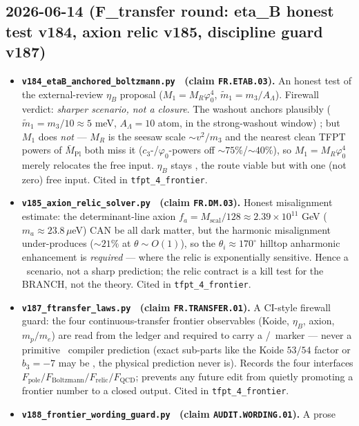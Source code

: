 \subsection*{2026-06-14 (F\_transfer round: eta\_B honest test v184, axion relic v185, discipline guard v187)}
\begin{itemize}
\item \textbf{\texttt{v184\_etaB\_anchored\_boltzmann.py} \mC\ (claim \texttt{FR.ETAB.03}).} An honest
  test of the external-review $\eta_B$ proposal ($M_1=M_R\varphi_0^4$, $\tilde m_1=m_3/A_\Lambda$).
  Firewall verdict: \emph{sharper scenario, not a closure}. The washout anchors plausibly
  ($\tilde m_1=m_3/10\approx5$ meV, $A_\Lambda=10$ atom, in the strong-washout window) \mC; but $M_1$
  does \emph{not} --- $M_R$ is the seesaw scale $\sim v^2/m_3$ and the nearest clean TFPT powers of
  $\bar M_{\mathrm{Pl}}$ both miss it ($c_3$-/$\varphi_0$-powers off ${\sim}75\%$/${\sim}40\%$), so
  $M_1=M_R\varphi_0^4$ merely relocates the free input. $\eta_B$ stays \mC, the route viable but with one
  (not zero) free input. Cited in \texttt{tfpt\_4\_frontier}.
\item \textbf{\texttt{v185\_axion\_relic\_solver.py} \mC\ (claim \texttt{FR.DM.03}).} Honest misalignment
  estimate: the determinant-line axion $f_a=M_{\mathrm{scal}}/128\approx2.39{\times}10^{11}$ GeV
  ($m_a\approx23.8\,\mu$eV) CAN be all dark matter, but the harmonic misalignment under-produces
  (${\sim}21\%$ at $\theta\sim O(1)$), so the $\theta_i\approx170^\circ$ hilltop anharmonic enhancement is
  \emph{required} --- where the relic is exponentially sensitive. Hence a \mC\ scenario, not a sharp
  prediction; the relic contract is a kill test for the BRANCH, not the theory. Cited in
  \texttt{tfpt\_4\_frontier}.
\item \textbf{\texttt{v187\_ftransfer\_laws.py} \mE\ (claim \texttt{FR.TRANSFER.01}).} A CI-style
  firewall guard: the four continuous-transfer frontier observables (Koide, $\eta_B$, axion,
  $m_p/m_e$) are read from the ledger and required to carry a \mC/\mO\ marker --- never a primitive
  \mE\ compiler prediction (exact sub-parts like the Koide $53/54$ factor or $b_3=-7$ may be \mE, the
  physical prediction never is). Records the four interfaces $F_{\mathrm{pole}}/F_{\mathrm{Boltzmann}}/
  F_{\mathrm{relic}}/F_{\mathrm{QCD}}$; prevents any future edit from quietly promoting a frontier
  number to a closed output. Cited in \texttt{tfpt\_4\_frontier}.
\item \textbf{\texttt{v188\_frontier\_wording\_guard.py} \mE\ (claim \texttt{AUDIT.WORDING.01}).} A prose

\end{itemize}
